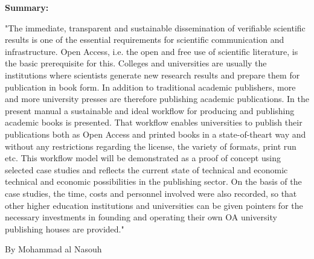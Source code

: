 \documentclass{article}
\begin{document}
\textbf{Summary: }


"The immediate, transparent and sustainable dissemination of verifiable scientific results is one of the essential requirements for scientific communication and infrastructure. Open Access, i.e. the open and free use of scientific literature, is the basic prerequisite for this. Colleges and universities are usually the institutions where scientists generate new research results and prepare them for publication in book form. In addition to traditional academic publishers, more and more university presses are therefore publishing academic publications. In the present manual a sustainable and ideal workflow for producing and publishing academic books is presented. That workflow enables universities to publish their publications both as Open Access and printed books in a state-of-theart way and without any restrictions regarding the license, the variety of formats, print run etc. This workflow model will be demonstrated as a proof of concept using selected case studies and reflects the current state of technical and economic technical and economic possibilities in the publishing sector. On the basis of the case studies, the time, costs and personnel involved were also recorded, so that other higher education institutions and universities can be given pointers for the necessary investments in founding and operating their own OA university publishing houses are provided."


By Mohammad al Nasouh 


\printbibliography[title={Literaturverzeichnis}]
\end{document}
